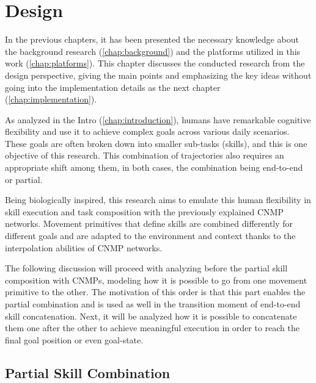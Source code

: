 \chapter{Design} 
\label{chap:design}

In the previous chapters, it has been presented the necessary knowledge about the background research (\cref{chap:background}) and the platforms utilized in this work (\cref{chap:platforms}). 
This chapter discusses the conducted research from the design perspective, giving the main points and emphasizing the key ideas without going into the implementation details as the next chapter (\cref{chap:implementation}). 

As analyzed in the Intro (\cref{chap:introduction}), humans have remarkable cognitive flexibility and use it to achieve complex goals across various daily scenarios. These goals are often broken down into smaller sub-tasks (skills), and this is one objective of this research. This combination of trajectories also requires an appropriate shift among them, in both cases, the combination being end-to-end or partial. 

Being biologically inspired, this research aims to emulate this human flexibility in skill execution and task composition with the previously explained CNMP networks. Movement primitives that define skills are combined differently for different goals and are adapted to the environment and context thanks to the interpolation abilities of CNMP networks.

The following discussion will proceed with analyzing before the partial skill composition with CNMPs, modeling how it is possible to go from one movement primitive to the other. The motivation of this order is that this part enables the partial combination and is used as well in the transition moment of end-to-end skill concatenation. 
Next, it will be analyzed how it is possible to concatenate them one after the other to achieve meaningful execution in order to reach the final goal position or even goal-state.


\section{Partial Skill Combination}

